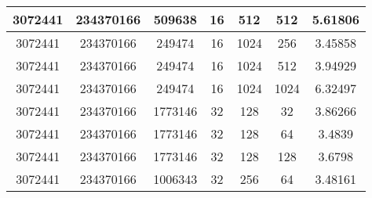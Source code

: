 \documentclass[9pt]{article}
\begin{document}
\begin{tabular}{|c|c|c|c|c|c|c| }
\hline
3072441  & 234370166  & 509638  & 16  & 512  & 512  & 5.61806 \\
\hline
3072441  & 234370166  & 249474  & 16  & 1024  & 256  & 3.45858 \\
\hline
3072441  & 234370166  & 249474  & 16  & 1024  & 512  & 3.94929 \\
\hline
3072441  & 234370166  & 249474  & 16  & 1024  & 1024  & 6.32497 \\
\hline
3072441  & 234370166  & 1773146  & 32  & 128  & 32  & 3.86266 \\
\hline
3072441  & 234370166  & 1773146  & 32  & 128  & 64  & 3.4839 \\
\hline
3072441  & 234370166  & 1773146  & 32  & 128  & 128  & 3.6798 \\
\hline
3072441  & 234370166  & 1006343  & 32  & 256  & 64  & 3.48161 \\
\hline
\end{tabular}
 
\end{document}
